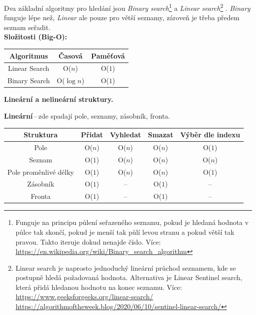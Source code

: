 Dva základní algoritmy pro hledání jsou \textit{Binary search}\footnote{Funguje na principu půlení seřazeného seznamu, pokud je hledaná hodnota v půlce tak skončí, pokud je menší tak půlí levou stranu a pokud větší tak pravou. Takto iteruje dokud nenajde číslo. Více:  \url{https://en.wikipedia.org/wiki/Binary_search_algorithm}} a \textit{Linear search}\footnote{Linear search je naprosto jednoduchý lineární průchod seznamem, kde se postupně hledá požadovaná hodnota. Alternativa je Linear Sentinel search, která přidá hledanou hodnotu na konec seznamu. Více: \url{https://www.geeksforgeeks.org/linear-search/} \url{https://algorithmoftheweek.blog/2020/06/10/sentinel-linear-search/}} . \textit{Binary} funguje lépe než, \textit{Linear} ale pouze pro větší seznamy, zároveň je třeba předem seznam seřadit. \\

\textbf{Složitosti (Big-O):}

\begin{table}[h]
    \centering
    \begin{tabular}{|c|c|c|}\hline
         Algoritmus & Časová & Paměťová\\\hline
         Linear Search & O($n$) & O($1$)\\\hline
         Binary Search & O($\log n$) & O($1$)\\\hline
    \end{tabular}
\end{table}


\vspace{1cm}
\begin{Large}\vspace{0,5cm} \textbf{Lineární a nelineární struktury.}
\end{Large}

\textbf{Lineární}\,--\,zde spadají pole, seznamy, zásobník, fronta.
\begin{table}[h]
    \centering
    \begin{tabular}{|c|c|c|c|c|}\hline
         Struktura & Přidat & Vyhledat & Smazat & Výběr dle indexu\\\hline
         Pole & O($n$) & O($n$) & O($n$) & O($1$) \\\hline
         Seznam & O($1$) & O($n$) & O($n$) & O($n$)\\\hline
         Pole proměnlivé délky & O($1$) & O($n$) & O($n$) & O($1$) \\\hline
         Zásobník & O($1$) & -- & O($1$) & -- \\\hline
         Fronta & O($1$) & -- & O($1$) & -- \\\hline
    \end{tabular}
\end{table}

